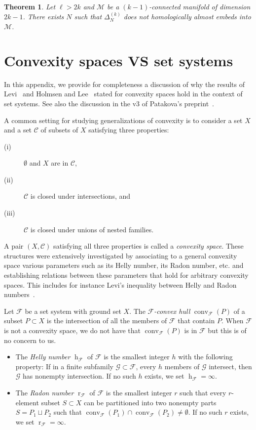 \documentclass[a4paper,UKenglish,thm-restate]{article}
\newcommand{\C}{\mathcal{C}}
\newcommand{\F}{\mathcal{F}}
\newcommand{\G}{\mathcal{G}}
\newcommand{\M}{\mathcal{M}}
\DeclareMathOperator{\h}{h}
\DeclareMathOperator{\conv}{conv}
\DeclareMathOperator{\rad}{r}
\newcommand{\defn}[1]{\emph{\color{violet}#1}}
\newtheorem{theorem}{Theorem}
\begin{document}
\begin{theorem}\label{t:odd-case}
Let $\ell>2k$ and $\M$ be a $(k-1)$-connected manifold of dimension $2k-1$. There exists $N$ such that $\Delta_N^{(k)}$ does not homologically almost embeds into $\M$.
\end{theorem}
\fi

\section{Convexity spaces VS set systems}\label{app:convspaces}

In this appendix, we provide for completeness a discussion of why the results of Levi~\cite{Levi_radon_implies_helly} and Holmsen and Lee~\cite{Holmsen2021} stated for convexity spaces hold in the context of set systems. See also the discussion in the v3 of Patakova's preprint~\cite[Appendix~A]{Pat_kov__2024}.

\bigskip

A common setting for studying generalizations of convexity is to consider a set $X$ and a set $\C$ of subsets of $X$ satisfying three properties:

\begin{description}
\item[(i)] $\emptyset$ and $X$ are in $\C$,
\item[(ii)] $\C$ is closed under intersections, and
\item[(iii)] $\C$ is closed under unions of nested families.
\end{description}

\noindent
A pair $(X,\C)$ satisfying all three properties is called a \defn{convexity space}. These structures were extensively investigated by associating to a general convexity space various parameters such as its Helly number, its Radon number, etc. and establishing relations between these parameters that hold for arbitrary convexity spaces. This includes for instance Levi's inequality between Helly and Radon numbers~\cite{Levi_radon_implies_helly}.

\medskip

Let $\F$ be a set system with ground set $X$. The \defn{$\F$-convex hull} $\conv_{\F}(P)$ of a subset $P\subset X$ is the intersection of all the members of $\F$ that contain $P$. When $\F$ is not a convexity space, we do not have that $\conv_{\F}(P)$ is in $\F$ but this is of no concern to us.

\begin{itemize}
\item The \defn{Helly number} $\h_\F$ of $\F$ is the smallest integer $h$ with the following property: If in a finite subfamily $\G \subset\F$, every $h$ members of $\G$ intersect, then $\G$ has nonempty intersection. If no such $h$ exists, we set $\h_\F=\infty$.\medskip

\item The \defn{Radon number} $\rad_\F$ of $\F$ is the smallest integer $r$ such that every $r$-element subset $S\subset X$ can be partitioned into two nonempty parts $S=P_1\sqcup P_2$ such that $\conv_{\F}(P_1) \cap \conv_{\F}(P_2) \neq \emptyset$. If no such $r$ exists, we set $\rad_\F=\infty$.
\end{itemize}
\end{document}
